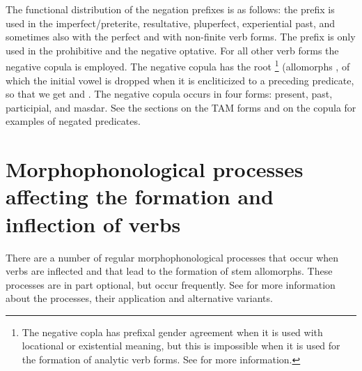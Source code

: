 The functional distribution of the negation prefixes is as follows: the prefix  is used in the imperfect/preterite, resultative, pluperfect, experiential past, and sometimes also with the perfect and with non-finite verb forms. The prefix  is only used in the prohibitive and the negative optative. For all other verb forms the negative copula is employed. The negative copula has the root \footnote{The negative copla has prefixal gender agreement when it is used with locational or existential meaning, but this is impossible when it is used for the formation of analytic verb forms. See  for more information.} (allomorphs , of which the initial vowel is dropped when it is encliticized to a preceding predicate, so that we get  and . The negative copula occurs in four forms: present, past, participial, and masdar. See the sections on the TAM forms and  on the copula for examples of negated predicates.



\section{Morphophonological processes affecting the formation and inflection of verbs}
\label{sec:Morphophonological processes affecting the formation and inflection of verbs}

There are a number of regular morphophonological processes that occur when verbs are inflected and that lead to the formation of stem allomorphs. These processes are in part optional, but occur frequently. See  for more information about the processes, their application and alternative variants.

